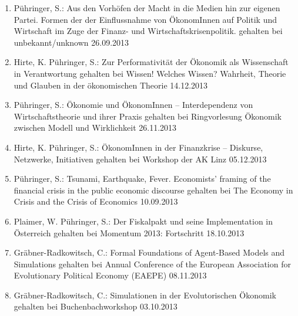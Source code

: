 \begin{enumerate}
	\item Pühringer, S.: Aus den Vorhöfen der Macht in die Medien hin zur eigenen Partei. Formen der der Einflussnahme von ÖkonomInnen auf Politik und Wirtschaft im Zuge der Finanz- und Wirtschaftskrisenpolitik. gehalten bei unbekannt/unknown 26.09.2013
	\item Hirte, K. Pühringer, S.: Zur Performativität der Ökonomik als Wissenschaft in Verantwortung gehalten bei Wissen! Welches Wissen? Wahrheit, Theorie und Glauben in der ökonomischen Theorie 14.12.2013
	\item Pühringer, S.: Ökonomie und ÖkonomInnen -- Interdependenz von Wirtschaftstheorie und ihrer Praxis gehalten bei Ringvorlesung Ökonomik zwischen Modell und Wirklichkeit 26.11.2013
	\item Hirte, K. Pühringer, S.: ÖkonomInnen in der Finanzkrise -- Diskurse, Netzwerke, Initiativen gehalten bei Workshop der AK Linz 05.12.2013
	\item Pühringer, S.: Tsunami, Earthquake, Fever. Economists’ framing of the financial crisis in the public economic discourse gehalten bei The Economy in Crisis and the Crisis of Economics 10.09.2013
	\item Plaimer, W. Pühringer, S.: Der Fiskalpakt und seine Implementation in Österreich gehalten bei Momentum 2013: Fortschritt 18.10.2013
	\item Gräbner-Radkowitsch, C.: Formal Foundations of Agent-Based Models and Simulations gehalten bei Annual Conference of the European Association for Evolutionary Political Economy (EAEPE) 08.11.2013
	\item Gräbner-Radkowitsch, C.: Simulationen in der Evolutorischen Ökonomik gehalten bei Buchenbachworkshop 03.10.2013
\end{enumerate}
